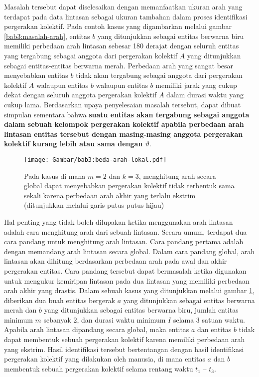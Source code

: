 Masalah tersebut dapat diselesaikan dengan memanfaatkan ukuran arah yang terdapat pada data lintasan sebagai ukuran tambahan dalam proses identifikasi pergerakan kolektif. Pada contoh kasus yang digambarkan melalui gambar \ref{bab3:masalah-arah}, entitas $b$ yang ditunjukkan sebagai entitas berwarna biru memiliki perbedaan arah lintasan sebesar 180 derajat dengan seluruh entitas yang tergabung sebagai anggota dari pergerakan kolektif $A$ yang ditunjukkan sebagai entitas-entitas berwarna merah. Perbedaan arah yang sangat besar menyebabkan entitas $b$ tidak akan tergabung sebagai anggota dari pergerakan kolektif $A$ walaupun entitas $b$ walaupun entitas $b$ memiliki jarak yang cukup dekat dengan seluruh anggota pergerakan kolektif $A$ dalam durasi waktu yang cukup lama. Berdasarkan upaya penyelesaian masalah tersebut, dapat dibuat simpulan sementara bahwa \textbf{suatu entitas akan tergabung sebagai anggota dalam sebuah kelompok pergerakan kolektif apabila perbedaan arah lintasan entitas tersebut dengan masing-masing anggota pergerakan kolektif kurang lebih atau sama dengan $\vartheta$}.

\begin{figure}
    \centering
    \texttt{[image: Gambar/bab3:beda-arah-lokal.pdf]}
    \caption{Pada kasus di mana $m = 2$ dan $k = 3$, menghitung arah secara global dapat menyebabkan pergerakan kolektif tidak terbentuk sama sekali karena perbedaan arah akhir yang terlalu ekstrim (ditunjukkan melalui garis putus-putus hijau)}
    \label{bab3:beda-arah-lokal}
\end{figure}

Hal penting yang tidak boleh dilupakan ketika menggunakan arah lintasan adalah cara menghitung arah dari sebuah lintasan. Secara umum, terdapat dua cara pandang untuk menghitung arah lintasan. Cara pandang pertama adalah dengan memandang arah lintasan secara global. Dalam cara pandang global, arah lintasan akan dihitung berdasarkan perbedaan arah pada awal dan akhir pergerakan entitas. Cara pandang tersebut dapat bermasalah ketika digunakan untuk mengukur kemiripan lintasan pada dua lintasan yang memiliki perbedaan arah akhir yang drastis. Dalam sebuah kasus yang ditunjukkan melalui gambar \ref{bab3:beda-arah-lokal}, diberikan dua buah entitas bergerak $a$ yang ditunjukkan sebagai entitas berwarna merah dan $b$ yang ditunjukkan sebagai entitas berwarna biru, jumlah entitas minimum $m$ sebanyak $2$, dan durasi waktu minimum $I$ selama $3$ satuan waktu. Apabila arah lintasan dipandang secara global, maka entitas $a$ dan entitas $b$ tidak dapat membentuk sebuah pergerakan kolektif karena memiliki perbedaan arah yang ekstrim. Hasil identifikasi tersebut bertentangan dengan hasil identifikasi pergerakan kolektif yang dilakukan oleh manusia, di mana entitas $a$ dan $b$ membentuk sebuah pergerakan kolektif selama rentang waktu $t_1$ -- $t_3$.

